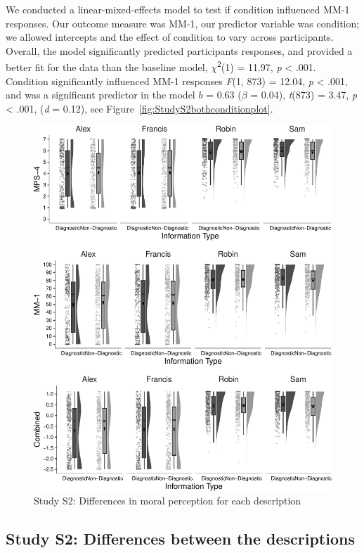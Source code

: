 \documentclass[
  man,floatsintext]{apa6}
\begin{document}
We conducted a linear-mixed-effects model to test if condition influenced MM-1 responses. Our outcome measure was MM-1, our predictor variable was condition; we allowed intercepts and the effect of condition to vary across participants. Overall, the model significantly predicted participants responses, and provided a better fit for the data than the baseline model, \(\chi\)\textsuperscript{2}(1) = 11.97, \emph{p} \textless{} .001. Condition significantly influenced MM-1 responses \emph{F}(1, 873) = 12.04, \emph{p} \textless{} .001, and was a significant predictor in the model \(b\) = 0.63 (\(\beta\) = 0.04), \emph{t}(873) = 3.47, \emph{p} \textless{} .001, (\emph{d} = 0.12), see Figure~\ref{fig:StudyS2bothconditionplot}.

\begin{figure}[!h]
\includegraphics[width=\textwidth,]{Supplementary_files/figure-latex/StudyS2AllscenariosPlot-1} \caption{Study S2: Differences in moral perception for each description}\label{fig:StudyS2AllscenariosPlot}
\end{figure}

\subsection{Study S2: Differences between the descriptions}\label{study-s2-differences-between-the-descriptions}
\end{document}
